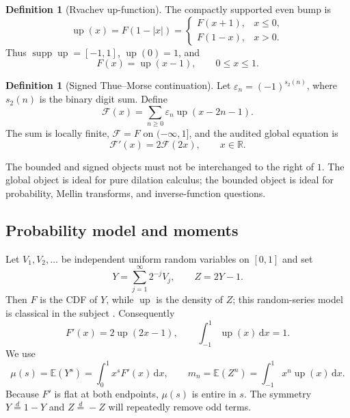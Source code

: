 \documentclass[11pt]{article}
\theoremstyle{definition}
\newtheorem{definition}[theorem]{Definition}
\theoremstyle{remark}
\newcommand{\R}{\mathbb R}
\newcommand{\E}{\mathbb E}
\newcommand{\dd}{\,\mathrm d}
\newcommand{\Up}{\operatorname{up}}
\newcommand{\supp}{\operatorname{supp}}
\newcommand{\extF}{\mathcal F}
\begin{document}
\begin{definition}[Rvachev up-function]
The compactly supported even bump is
\begin{equation}
 \Up(x)=F(1-|x|)=
 \begin{cases}
  F(x+1),&x\le0,\\
  F(1-x),&x>0.
 \end{cases}
 \label{eq:up-fold}
\end{equation}
Thus $\supp\Up=[-1,1]$, $\Up(0)=1$, and
\begin{equation}
 F(x)=\Up(x-1),\qquad 0\le x\le1.
 \label{eq:F-up-translate}
\end{equation}
\end{definition}

\begin{definition}[Signed Thue--Morse continuation]
Let $\varepsilon_n=(-1)^{s_2(n)}$, where $s_2(n)$ is the binary digit sum.  Define
\begin{equation}
 \extF(x)=\sum_{n\ge0}\varepsilon_n\Up(x-2n-1).
 \label{eq:global-F}
\end{equation}
The sum is locally finite, $\extF=F$ on $(-\infty,1]$, and the audited global equation is
\begin{equation}
 \extF'(x)=2\extF(2x),\qquad x\in\R.
 \label{eq:global-dilation}
\end{equation}
\end{definition}

The bounded and signed objects must not be interchanged to the right of $1$.  The global
object is ideal for pure dilation calculus; the bounded object is ideal for probability,
Mellin transforms, and inverse-function questions.

\subsection{Probability model and moments}

Let $V_1,V_2,\ldots$ be independent uniform random variables on $[0,1]$ and set
\begin{equation}
 Y=\sum_{j=1}^{\infty}2^{-j}V_j,
 \qquad
 Z=2Y-1.
 \label{eq:Y-Z}
\end{equation}
Then $F$ is the CDF of $Y$, while $\Up$ is the density of $Z$; this random-series model
is classical in the subject \cite{arias1982,arias2018,project-frontier}.  Consequently
\begin{equation}
 F'(x)=2\Up(2x-1),
 \qquad
 \int_{-1}^{1}\Up(x)\dd x=1.
 \label{eq:Fprime-up}
\end{equation}
We use
\begin{equation}
 \mu(s)=\E(Y^s)=\int_0^1x^sF'(x)\dd x,
 \qquad
 m_n=\E(Z^n)=\int_{-1}^{1}x^n\Up(x)\dd x.
 \label{eq:moments}
\end{equation}
Because $F'$ is flat at both endpoints, $\mu(s)$ is entire in $s$.  The symmetry
$Y\overset d=1-Y$ and $Z\overset d=-Z$ will repeatedly remove odd terms.
\end{document}
